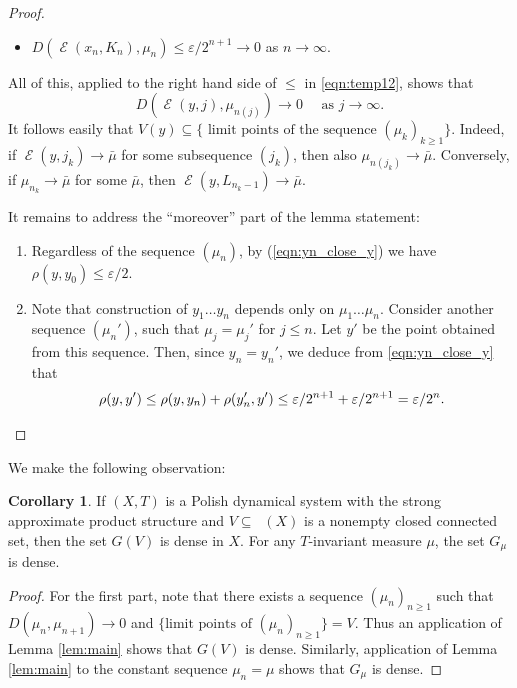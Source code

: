 \documentclass{amsart}
\theoremstyle{definition}
\newtheorem{cor}[thm]{Corollary}
\DeclareMathOperator{\Emp}{\mathcal{E}}%
\DeclareMathOperator{\MT}{\mathcal{M}_{\mathit T} }
\newcommand{\eps}{\varepsilon}
\begin{document}
\begin{proof}
\begin{itemize}
\begin{itemize}
    \item[$\circ$] $D(\Emp(x_n, K_n), \mu_{n}) \le \eps / 2^{n+1} \to 0$ as $n \to \infty$.
  \end{itemize}
\end{itemize}
All of this, applied to the right hand side of $\le$ in \eqref{eqn:temp12}, shows that
\begin{equation}
D(\Emp(y, j), \mu_{n(j)}) \to 0 \quad \textrm{ as } j \to \infty.
\end{equation}
It follows easily that $V(y) \subseteq \{ \textrm{ limit points of the sequence } (\mu_k)_{k \geq 1} \}$. Indeed, if $\Emp(y, j_k) \to \bar{\mu}$ for some subsequence $(j_k)$, then also $\mu_{n(j_k)} \to \bar{\mu}$. Conversely, if $\mu_{n_k} \to \bar{\mu}$ for some $\bar{\mu}$, then $\Emp(y, L_{n_k - 1}) \to \bar{\mu}$.

It remains to address the ``moreover'' part of the lemma statement:
\begin{enumerate}
  \item Regardless of the sequence $(\mu_n)$, by (\ref{eqn:yn_close_y}) we have $\rho(y, y_0) \le \eps / 2$.
  \item Note that construction of $y_1 \dots y_n$ depends only on $\mu_1 \dots \mu_n$. Consider another sequence $(\mu_n')$, such that $\mu_j = \mu_j'$ for $j \le n$. Let $y'$ be the point obtained from this sequence. Then, since $y_n = y_n'$, we deduce from \eqref{eqn:yn_close_y} that
  \[
    \rho(y, y') \le \rho(y, y_n) + \rho(y_n', y') \le \eps /2^{n+1} + \eps /2^{n+1} = \eps / 2^n.
  \qedhere\]
\end{enumerate}
\end{proof}


We make the following observation:
\begin{cor} \label{cor:dense-gv}
If $(X,T)$ is  a Polish dynamical system with the strong approximate product structure
and $V\subseteq \MT(X)$ is a nonempty closed connected set, then the set $G(V)$ is dense in $X$.
For any $T$-invariant measure $\mu$, the set $G_\mu$ is dense.
\end{cor}

\begin{proof}
For the first part, note that there exists a sequence $(\mu_n)_{n \ge 1}$ such that $D(\mu_n, \mu_{n+1}) \to 0$ and $\{ \textrm{limit points of } (\mu_n)_{n \ge 1} \} = V$. Thus an application of Lemma \ref{lem:main} shows that $G(V)$ is dense. Similarly, application of Lemma \ref{lem:main} to the constant sequence $\mu_n = \mu$ shows that $G_\mu$ is dense.
\end{proof}
\end{document}

